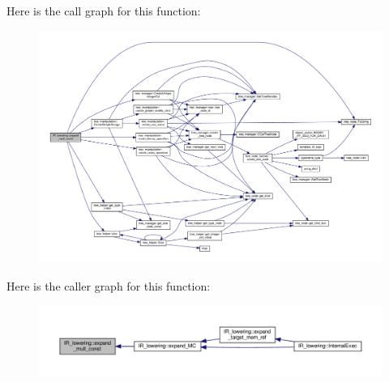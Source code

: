 Here is the call graph for this function\+:
\nopagebreak
\begin{figure}[H]
\begin{center}
\leavevmode
\includegraphics[width=350pt]{df/d7d/classIR__lowering_ae6f7d0298f7b68ce521fc42e769a090f_cgraph}
\end{center}
\end{figure}
Here is the caller graph for this function\+:
\nopagebreak
\begin{figure}[H]
\begin{center}
\leavevmode
\includegraphics[width=350pt]{df/d7d/classIR__lowering_ae6f7d0298f7b68ce521fc42e769a090f_icgraph}
\end{center}
\end{figure}
\mbox{\label{classIR__lowering_a7c9d4a3404e6c21b09acb961d905ae53}} 
